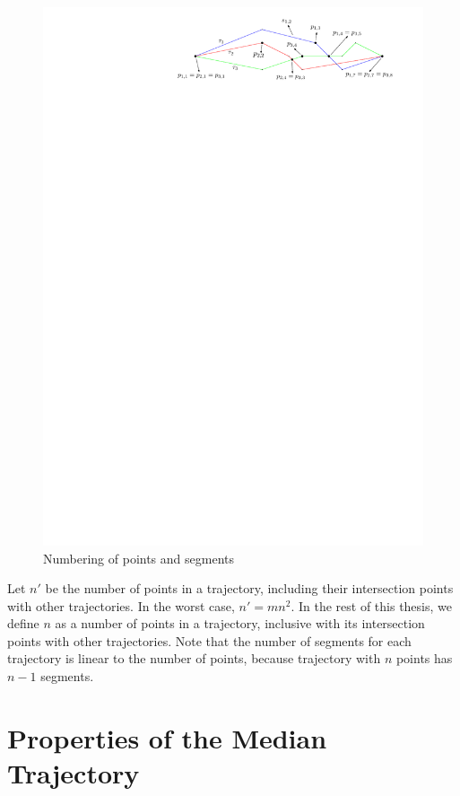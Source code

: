 \begin{figure}
\centering
\includegraphics[scale=0.8]{Gambar/number_trj}
\caption[Numbering of points and segments]{Numbering of points and segments} 
\label{fig:number_trj}
\end{figure}

Let $n'$ be the number of points in a trajectory, including their intersection points with other trajectories. 
In the worst case, $n' = mn^{2}$. 
In the rest of this thesis, we define $n$ as a number of points in a trajectory, inclusive with its intersection points with other trajectories. 
Note that the number of segments for each trajectory is linear to the number of points, because trajectory with $n$ points has $n-1$ segments.

\section{Properties of the Median Trajectory}
\label{sec:prop_medtrj}

